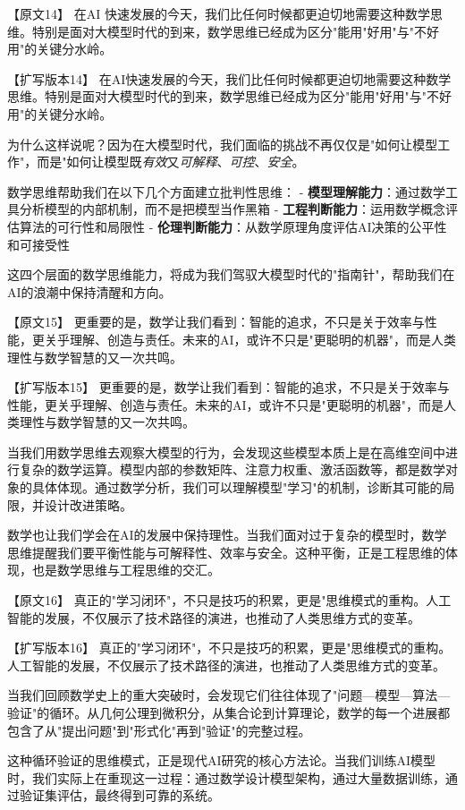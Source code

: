 {【原文14】
在AI 快速发展的今天，我们比任何时候都更迫切地需要这种数学思维。特别是面对大模型时代的到来，数学思维已经成为区分"能用"好用"与"不好用"的关键分水岭。

【扩写版本14】
在AI快速发展的今天，我们比任何时候都更迫切地需要这种数学思维。特别是面对大模型时代的到来，数学思维已经成为区分"能用"好用"与"不好用"的关键分水岭。

为什么这样说呢？因为在大模型时代，我们面临的挑战不再仅仅是"如何让模型工作"，而是"如何让模型既\emph{有效}又\emph{可解释}、\emph{可控}、\emph{安全}。

数学思维帮助我们在以下几个方面建立批判性思维：
- \textbf{模型理解能力}：通过数学工具分析模型的内部机制，而不是把模型当作黑箱
- \textbf{工程判断能力}：运用数学概念评估算法的可行性和局限性
- \textbf{伦理判断能力}：从数学原理角度评估AI决策的公平性和可接受性

这四个层面的数学思维能力，将成为我们驾驭大模型时代的"指南针"，帮助我们在AI的浪潮中保持清醒和方向。

【原文15】
更重要的是，数学让我们看到：智能的追求，不只是关于效率与性能，更关乎理解、创造与责任。未来的AI，或许不只是"更聪明的机器"，而是人类理性与数学智慧的又一次共鸣。

【扩写版本15】
更重要的是，数学让我们看到：智能的追求，不只是关于效率与性能，更关乎理解、创造与责任。未来的AI，或许不只是"更聪明的机器"，而是人类理性与数学智慧的又一次共鸣。

当我们用数学思维去观察大模型的行为，会发现这些模型本质上是在高维空间中进行复杂的数学运算。模型内部的参数矩阵、注意力权重、激活函数等，都是数学对象的具体体现。通过数学分析，我们可以理解模型"学习"的机制，诊断其可能的局限，并设计改进策略。

数学也让我们学会在AI的发展中保持理性。当我们面对过于复杂的模型时，数学思维提醒我们要平衡性能与可解释性、效率与安全。这种平衡，正是工程思维的体现，也是数学思维与工程思维的交汇。

【原文16】
真正的"学习闭环"，不只是技巧的积累，更是"思维模式的重构。人工智能的发展，不仅展示了技术路径的演进，也推动了人类思维方式的变革。

【扩写版本16】
真正的"学习闭环"，不只是技巧的积累，更是"思维模式的重构。人工智能的发展，不仅展示了技术路径的演进，也推动了人类思维方式的变革。

当我们回顾数学史上的重大突破时，会发现它们往往体现了"问题—模型—算法—验证"的循环。从几何公理到微积分，从集合论到计算理论，数学的每一个进展都包含了从"提出问题"到"形式化"再到"验证"的完整过程。

这种循环验证的思维模式，正是现代AI研究的核心方法论。当我们训练AI模型时，我们实际上在重现这一过程：通过数学设计模型架构，通过大量数据训练，通过验证集评估，最终得到可靠的系统。

}
